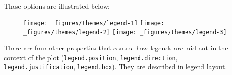 These options are illustrated below:

\begin{Shaded}
\begin{Highlighting}[]
\StringTok{ }\NormalTok{(} \NormalTok{:}\NormalTok{, } \NormalTok{:}\NormalTok{, } \NormalTok{(}\NormalTok{(}\NormalTok{, }\NormalTok{), } \NormalTok{))}
\StringTok{ } \StringTok{ }\NormalTok{()}

\StringTok{ }\NormalTok{(}
   \NormalTok{(}
     \NormalTok{, }
     \NormalTok{, }
     
  \NormalTok{)}
\NormalTok{)}
\StringTok{ }\NormalTok{(}
   \NormalTok{(} \NormalTok{),}
   \NormalTok{(}\NormalTok{, }\NormalTok{),}
   \NormalTok{(}\NormalTok{, }\NormalTok{)}
\NormalTok{)}
\StringTok{ }\NormalTok{(}
   \NormalTok{(} \NormalTok{),}
   \NormalTok{(} \NormalTok{, } \NormalTok{)}
\NormalTok{)}
\end{Highlighting}
\end{Shaded}

\begin{figure}[H]
  \texttt{[image: \_figures/themes/legend-1]}%
  \texttt{[image: \_figures/themes/legend-2]}%
  \texttt{[image: \_figures/themes/legend-3]}
\end{figure}

There are four other properties that control how legends are laid out in
the context of the plot (\texttt{legend.position},
\texttt{legend.direction}, \texttt{legend.justification},
\texttt{legend.box}). They are described in
\hyperref[sub:legend-layout]{legend layout}.


